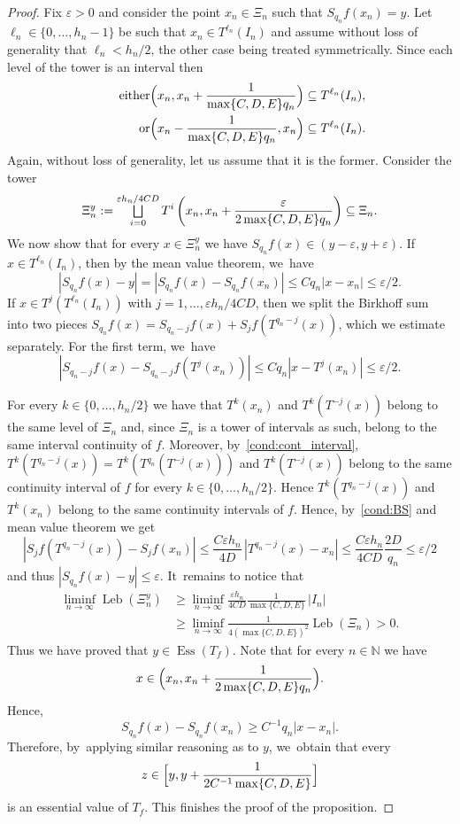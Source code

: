 \documentclass[10pt,a4paper]{article}
\let\oldbigsqcup\bigsqcup
\renewcommand{\bigsqcup}{\mathop{\textstyle\oldbigsqcup}\displaylimits}
\let\epsilon\varepsilon
\DeclareMathOperator{\Ess}{Ess}
\DeclareMathOperator{\Leb}{Leb}
\theoremstyle{plain}
\theoremstyle{definition}
\newcommand{\N}{\mathbb{N}}
\begin{document}
\begin{proof}
Fix $\epsilon>0$ and consider the point {$x_n \in \Xi_n$ such that $S_{q_n}f(x_n)=y$}.
Let $\ell_n\in\{0,\ldots,h_n-1\}$ be such that $x_n\in T^{\ell_n}(I_n)$ and assume without loss of generality that $\ell_n<h_{n}/2$, the other case being treated symmetrically. Since each level of the tower is an interval then
\begin{align*}
\tag*{either}
\Bigl(x_n,x_n+\frac{1}{\max\{C, D,E\} q_n}\Bigr)\subseteq T^{\ell_n}(I_n),\\
\tag*{or} \Bigl(x_n-\frac{1}{\max\{C,D,E\} q_n},x_n\Bigr)\subseteq T^{\ell_n}(I_n).
\end{align*}
Again, without loss of generality, let us assume that it is the former. Consider the tower
\[
\Xi_n^y:=\bigsqcup_{i=0}^{\epsilon h_n/4CD} T^i\left(x_n,x_n+\frac{\epsilon}{2\max\{C,D,E\} q_n}\right)\subseteq \Xi_n.
\]
We now show that for every $x\in \Xi_n^y$ we have $S_{q_n}f(x)\in(y-\epsilon,y+\epsilon)$. If $x\in T^{\ell_n}(I_n)$, then by the mean value theorem, we~have
\[
\left|S_{q_n}f(x)-y\right|=\left|S_{q_n}f(x)-S_{q_n}f(x_n)\right|\le Cq_n|x-x_n|\le \epsilon/2.
\]
If $x\in T^{j} (T^{\ell_n}(I_n))$ with $j=1,\ldots,\epsilon h_n/4CD$, then we
split the Birkhoff sum into two pieces $S_{q_n}f(x) = S_{q_n - j}f (x) +
S_jf(T^{q_n - j}(x))$, which we estimate separately. For the first term, we~have
\[
\left|S_{q_n-j} f(x)-S_{q_n-j} f(T^j(x_n))\right|\le Cq_n|x-T^j(x_n)|\le\epsilon/2.
\]

For every $k\in\{0,\ldots,h_n/2\}$ we have that $T^{k}(x_n)$ and
$T^{k}(T^{-j}(x))$ belong to the same level of $\Xi_n$ and, since $\Xi_n$ is a
tower of intervals as such, belong to the same interval continuity of $f$.
Moreover, by~\eqref{cond:cont_interval}, $T^k(T^{q_n-j}(x))=T^k(T^{q_n}(T^{-j}(x)))$ and
$T^{k}(T^{-j}(x))$ belong to the same
continuity interval of $f$ for every $k\in\{0,\ldots,h_n/2\}$. Hence
$T^k(T^{q_n-j}(x))$ and $T^k(x_n)$ belong to the same continuity intervals of
$f$. Hence, by~\eqref{cond:BS} and mean value theorem we
get
\[
\left|S_j f(T^{q_n-j}(x))-S_j f(x_n)\right|\le \frac{C\epsilon h_n}{4D}\,|T^{q_n-j}(x)-x_n|\le \frac{C\epsilon h_n}{4CD} \frac{2D}{q_n}\le\epsilon/2
\]
and thus $|S_{q_n} f(x)-y|\le \epsilon$. It~remains to notice that
\begin{align*}
\liminf_{n\to\infty}\Leb(\Xi_n^y)&\ge \liminf_{n\to\infty}\frac{\epsilon h_n}{4CD}\frac{1}{\max\{C,D,E\}}\,|I_n|\\
&\ge \liminf_{n\to\infty} \frac{1}{4(\max\{C,D,E\})^2}\Leb(\Xi_n)>0.
\end{align*}
Thus we have proved that $y\in \Ess(T_f)$. Note that for every $n\in\N$ {we have}
\[
x\in \Bigl(x_n,x_n+\frac{1}{2\max\{C,D,E\} q_n}\Bigr).
\]
Hence,
\[
S_{q_n}f(x)-S_{q_n}f(x_n)\ge C^{-1}q_n |x-x_n|.
\]
Therefore, by~applying similar reasoning as to $y$, we~obtain that every
\[
z\in\Bigl[y,y+\frac{1}{2C^{-1}\max\{C,D,E\}}\Bigr]
\]
is an essential value of $T_f$. This finishes the proof of the proposition.
\end{proof}
\end{document}
